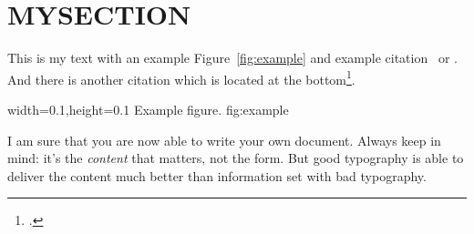 

\chapter{MYSECTION}

This is my text with an example Figure~\ref{fig:example} and example
citation~\cite{Voit2011} or \textcite{Voit2009}. And there is another
citation which is located at the bottom\footcite{tagstore}.

      {width=0.1\textwidth,height=0.1\textheight}%
      {Example figure.}%
      {fig:example}%

I am sure that you are now able to write your own
document. Always keep in mind: it's the \emph{content} that
matters, not the form. But good typography is able to deliver
the content much better than information set with bad
typography.


